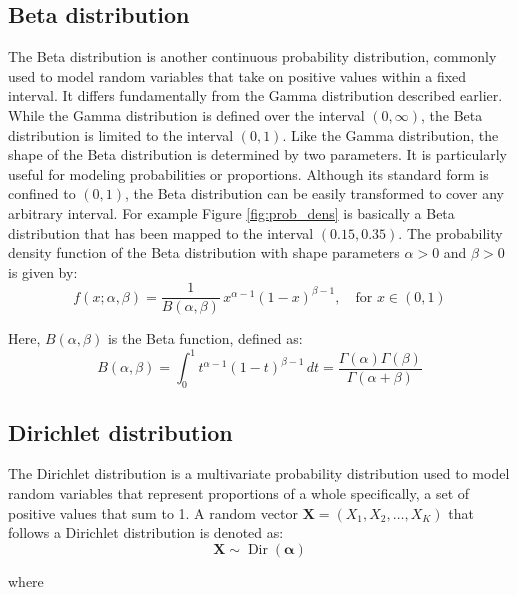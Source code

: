 \documentclass[12pt,a4paper]{article}
\begin{document}
	\subsection{Beta distribution}
	The Beta distribution is another continuous probability distribution, commonly used to model random variables that take on positive values within a fixed interval. It differs fundamentally from the Gamma distribution described earlier. While the Gamma distribution is defined over the interval $(0,\infty)$, the Beta distribution is limited to the interval $(0,1)$. Like the Gamma distribution, the shape of the Beta distribution is determined by two parameters. It is particularly useful for modeling probabilities or proportions. Although its standard form is confined to $(0, 1)$, the Beta distribution can be easily transformed to cover any arbitrary interval. For example Figure \ref{fig:prob_dens} is basically a Beta distribution that has been mapped to the interval $(0.15,0.35)$.
	The probability density function  of the Beta distribution with shape parameters \( \alpha > 0 \) and \( \beta > 0 \) is given by:
	\begin{equation}
		f(x; \alpha, \beta) = \frac{1}{B(\alpha, \beta)} \, x^{\alpha - 1} (1 - x)^{\beta - 1}, \quad \text{for } x \in (0, 1)
		\label{eq:beta_pdf}
	\end{equation}
	
	Here, \( B(\alpha, \beta) \) is the Beta function, defined as:
	\begin{equation}
		B(\alpha, \beta) = \int_0^1 t^{\alpha - 1} (1 - t)^{\beta - 1} \, dt = \frac{\Gamma(\alpha)\Gamma(\beta)}{\Gamma(\alpha + \beta)}
		\label{eq:beta_function}
	\end{equation}
	


	\subsection{Dirichlet distribution}
	The Dirichlet distribution is a multivariate probability distribution used to model random variables that represent proportions of a whole specifically, a set of positive values that sum to 1. 
    A random vector $\mathbf{X}=(X_1, X_2, \ldots, X_K)$ that follows a Dirichlet distribution is denoted as: 
	\begin{equation}
		\mathbf{X} \sim \operatorname{Dir}(\boldsymbol{\alpha})
	\end{equation}
	
	where 
	
\end{document}
